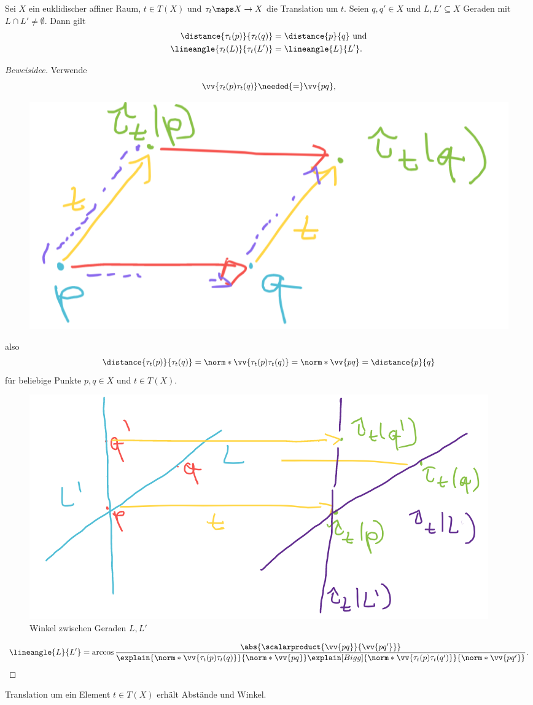 \begin{lemma}
  Sei \( X \) ein euklidischer affiner Raum, \( t\in T(X) \) und \( \tau_t\maps X\to X \) die Translation um \( t \). Seien \( q,q'\in X \) und \( L,L'\subseteq X \) Geraden mit \( L\cap L'\neq \emptyset \). Dann gilt 
  \begin{align*}
    \distance{\tau_t(p)}{\tau_t(q)}&=\distance{p}{q}\text{ und}\\
    \lineangle{\tau_t(L)}{\tau_t(L')}&=\lineangle{L}{L'}.
  \end{align*}
\end{lemma}
\begin{proof}[Beweisidee]
  Verwende
  \begin{equation*}
    \vv{\tau_t(p) \tau_t(q)}\needed{=}\vv{pq},
  \end{equation*}
  \begin{figure}[H]
    \centering
    \includegraphics[width=0.5\linewidth]{figures/translation_erhaelt_winkel_beweis_translation_erhaelt_verschiebungen}
    \label{fig:translation_erhaelt_winkel_beweis_translation_erhaelt_verschiebungen}
  \end{figure}
  also
  \begin{equation*}
    \distance{\tau_t(p)}{\tau_t(q)}=\norm*{\vv{\tau_t(p)\tau_t(q)}}=\norm*{\vv{pq}}=\distance{p}{q}
  \end{equation*}
  für beliebige Punkte \( p,q\in X \) und \( t\in T(X) \).
  \begin{figure}[H]
    \centering
    \includegraphics[width=0.5\linewidth]{figures/translation_erhaelt_winkel_beweis_winkel_zwischen_geraden}
    \caption*{Winkel zwischen Geraden \( L,L' \)}
    \label{fig:translation_erhaelt_winkel_beweis_winkel_zwischen_geraden}
  \end{figure}
  \begin{equation*}
    \lineangle{L}{L'}=\arccos \frac{\abs{\scalarproduct{\vv{pq}}{\vv{pq'}}}}{\explain{\norm*{\vv{\tau_t(p)\tau_t(q)}}}{\norm*{\vv{pq}}}\explain[Bigg]{\norm*{\vv{\tau_t(p)\tau_t(q')}}}{\norm*{\vv{pq'}}}}.
  \end{equation*}
\end{proof}
 Translation um ein Element \( t\in T(X) \) erhält Abstände und Winkel.

